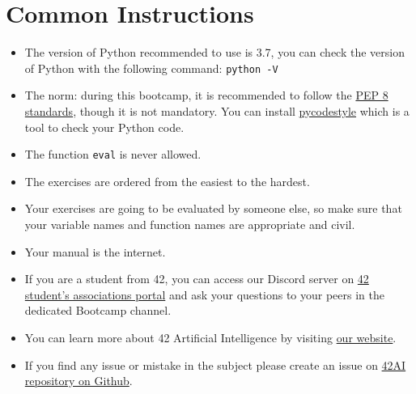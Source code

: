 
\chapter{Common Instructions}
\begin{itemize}
  \item The version of Python recommended to use is 3.7, you can
  check the version of Python with the following command: \texttt{python -V}
  
  \item The norm: during this bootcamp, it is recommended to follow the
  \href{https://www.python.org/dev/peps/pep-0008/}{PEP 8 standards}, though it is not mandatory.
  You can install \href{https://pypi.org/project/pycodestyle}{pycodestyle} which
  is a tool to check your Python code.
  \item The function \texttt{eval} is never allowed.
  \item The exercises are ordered from the easiest to the hardest.
  \item Your exercises are going to be evaluated by someone else,
  so make sure that your variable names and function names are appropriate and civil.
  \item Your manual is the internet.
  
  \item If you are a student from 42, you can access our Discord server 
  on \href{https://discord.com/channels/887850395697807362/887850396314398720}{42 student's associations portal} and ask your
  questions to your peers in the dedicated Bootcamp channel. 

  \item You can learn more about 42 Artificial Intelligence by visiting \href{https://42-ai.github.io}{our website}.

  \item If you find any issue or mistake in the subject please create an issue on \href{https://github.com/42-AI/bootcamp_machine-learning/issues}{42AI repository on Github}.
  

\end{itemize}
